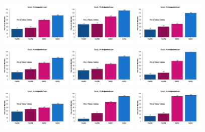 \documentclass[a4paper ]{article}
\begin{document}
\begin{figure}[th]
\centering
\includegraphics[width=0.3\textwidth]{Figures/MirrorRate_Exp2_P1} \includegraphics[width=0.3\textwidth]{Figures/MirrorRate_Exp2_P2} \includegraphics[width=0.3\textwidth]{Figures/MirrorRate_Exp2_P3}
\includegraphics[width=0.3\textwidth]{Figures/MirrorRate_Exp2_P4} \includegraphics[width=0.3\textwidth]{Figures/MirrorRate_Exp2_P5} \includegraphics[width=0.3\textwidth]{Figures/MirrorRate_Exp2_P6}
\includegraphics[width=0.3\textwidth]{Figures/MirrorRate_Exp2_P7} \includegraphics[width=0.3\textwidth]{Figures/MirrorRate_Exp2_P8} \includegraphics[width=0.3\textwidth]{Figures/MirrorRate_Exp2_P9}

\end{figure}
\end{document}
